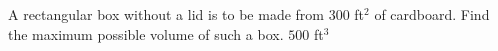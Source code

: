 {A rectangular box without a lid is to be made from 300 ft$^2$ of cardboard.  Find the maximum possible volume of such a box.
}
{
$500$ ft$^3$
}